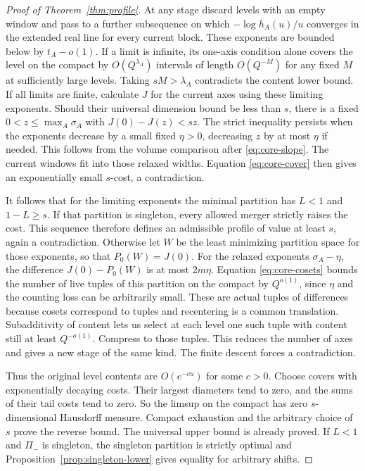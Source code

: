 \documentclass[11pt,reqno,a4paper]{amsart}
\theoremstyle{remark}
\numberwithin{equation}{section}
\begin{document}
\begin{proof}[Proof of Theorem~\ref{thm:profile}]
At any stage discard levels with an empty window and pass to a
further subsequence on which $-\log h_A(u)/u$ converges in the
extended real line for every current block. These exponents
are bounded below by $t_A-o(1)$. If a limit is infinite, its
one-axis condition alone covers the level on the compact by
$O(Q^{\lambda_A})$ intervals of length $O(Q^{-M})$ for any
fixed $M$ at sufficiently large levels. Taking $sM>\lambda_A$
contradicts the content lower bound. If all limits are finite,
calculate $J$ for the current axes using these limiting
exponents. Should their universal dimension bound be less than
$s$, there is a fixed $0<z\le\max_A\sigma_A$ with
$J(0)-J(z)<sz$. The strict inequality persists when the
exponents decrease by a small fixed $\eta>0$, decreasing
$z$ by at most $\eta$ if needed. This follows from the volume
comparison after \eqref{eq:core-slope}. The current windows
fit into those relaxed widths. Equation \eqref{eq:core-cover}
then gives an exponentially small $s$-cost, a contradiction.

It follows that for the limiting exponents the minimal
partition has $L<1$ and $1-L\ge s$. If that partition is
singleton, every allowed merger strictly raises the cost. This
sequence therefore defines an admissible profile of value at least
$s$, again a contradiction. Otherwise let $W$ be the least
minimizing partition space for those exponents, so that
$P_0(W)=J(0)$. For the relaxed exponents $\sigma_A-\eta$, the
difference $J(0)-P_0(W)$ is at most $2m\eta$. Equation
\eqref{eq:core-cosets} bounds the number of live tuples of this
partition on the compact by $Q^{o(1)}$, since $\eta$ and the
counting loss can be arbitrarily small. These are actual
tuples of differences because cosets correspond to tuples
and recentering is a common translation. Subadditivity of
content lets us select at each level one such tuple with
content still at least $Q^{-o(1)}$. Compress to those tuples.
This reduces the number of axes and gives a new stage of the
same kind. The finite descent forces a contradiction.

Thus the original level contents are $O(e^{-cu})$ for some
$c>0$. Choose covers with exponentially decaying costs.
Their largest diameters tend to zero, and the sums of their
tail costs tend to zero. So the limsup on the compact has
zero $s$-dimensional Hausdorff measure. Compact exhaustion
and the arbitrary choice of $s$ prove the reverse bound.
The universal upper bound is already proved. If $L<1$ and
$\Pi_-$ is singleton, the singleton partition is strictly
optimal and Proposition~\ref{prop:singleton-lower} gives
equality for arbitrary shifts.
\end{proof}
\end{document}
